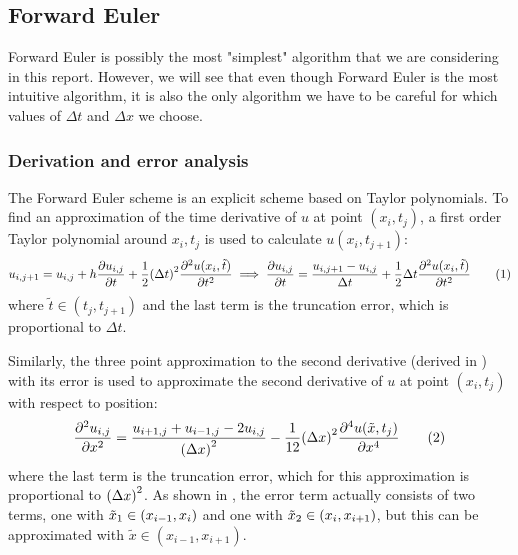 \documentclass[12pt,english,a4paper]{article}
\newcommand{\eqtag}[1]{\refstepcounter{equation}\tag{\theequation}\label{#1}}
\begin{document}
\subsection{Forward Euler}
Forward Euler is possibly the most "simplest" algorithm that we are considering in this report. However, we will see that even though Forward Euler is the most intuitive algorithm, it is also the only algorithm we have to be careful for which values of \(\Delta t\) and \(\Delta x\) we choose. 
\subsubsection{Derivation and error analysis}\label{sec:ForwardEulerDerivation}
The Forward Euler scheme is an explicit scheme based on Taylor polynomials. To find an approximation of the time derivative of \(u\) at point \((x_i,t_j)\), a first order Taylor polynomial around \(x_i,t_j\) is used to calculate \(u(x_i,t_{j+1})\):
\[
    u_{i,j+1} = u_{i,j} + h\pdv{u_{i,j}}{t} + \frac{1}{2}\qty(\Delta t)^2\pdv[2]{u(x_i,\tilde{t})}{t}
    \implies \pdv{u_{i,j}}{t} = \frac{u_{i,j+1}-u_{i,j}}{\Delta t} + \frac{1}{2}\Delta t\pdv[2]{u(x_i,\tilde{t})}{t}\eqtag{asymmnewton}
\]
where \(\tilde{t}\in(t_j,t_{j+1})\) and the last term is the truncation error, which is proportional to \(\Delta t\).

Similarly, the three point approximation to the second derivative (derived in \autocite{oblig1}) with its error is used to approximate the second derivative of \(u\) at point \((x_i,t_j)\) with respect to position:
\[
    \pdv[2]{u_{i,j}}{x} = \frac{u_{i+1,j} + u_{i-1,j} - 2u_{i,j}}{\qty(\Delta x)^2} - \frac{1}{12}\qty(\Delta x)^2\pdv[4]{u(\tilde{x},t_j)}{x}\eqtag{andrederivert}
\]
where the last term is the truncation error, which for this approximation is proportional to \(\qty(\Delta x)^2\). As shown in \autocite{oblig1}, the error term actually consists of two terms, one with \(\tilde{x}_1\in\qty(x_{i-1},x_i)\) and one with \(\tilde{x}_2\in\qty(x_i,x_{i+1})\), but this can be approximated with \(\tilde{x}\in(x_{i-1},x_{i+1})\).
\end{document}
